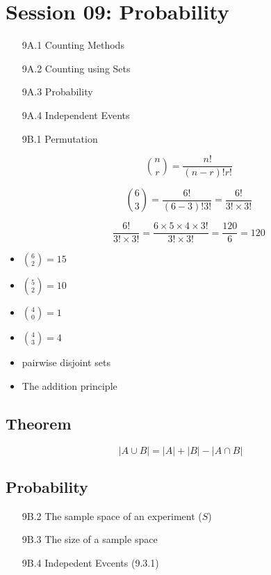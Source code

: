 \documentclass[12pt]{report}
\begin{document}
\section*{Session 09: Probability}
\begin{itemize}
	\item[9A.1] Counting Methods
	\item[9A.2] Counting using Sets
	\item[9A.3] Probability
	\item[9A.4] Independent Events
\end{itemize}
\begin{itemize}
	\item[9B.1] Permutation
	
	\[ {n \choose r} = \frac{n!}{(n-r)! r!} \]
	
	
	\[ {6 \choose 3} = \frac{6!}{(6-3)! 3!} = \frac{6!}{3! \times 3!}\]
	
	
	\[ \frac{6!}{3! \times 3!} = \frac{6 \times 5 \times 4 \times 3!}{3! \times 3!} = \frac{120}{6} = 120\]
\end{itemize}

\begin{itemize}
	\item ${6 \choose 2} = 15$
	\item ${5 \choose 2} = 10$  
	\item ${4 \choose 0} = 1$  
	\item ${4 \choose 3} = 4$  
\end{itemize}

\begin{itemize}
	\item pairwise disjoint sets
	\item The addition principle
\end{itemize}
\subsection*{Theorem}
\[ |A \cup B| = |A| + |B| - |A \cap B|  \]

\subsection*{Probability}
\begin{itemize}
	\item[9B.2] The sample space of an experiment ($S$)
	\item[9B.3] The size of a sample space
	\item[9B.4] Indepedent Evcents (9.3.1)
\end{itemize}
\end{document}
